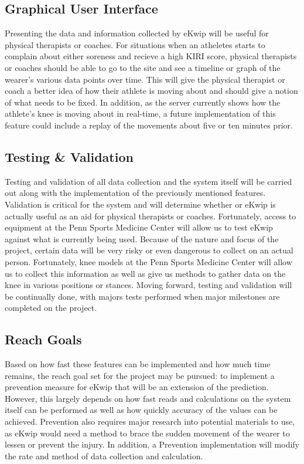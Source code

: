 \subsection {Graphical User Interface}
Presenting the data and information collected by eKwip will be useful for physical therapists or coaches. For situations when an atheletes starts to complain about either soreness and recieve a high KIRI score, physical therapists or coaches should be able to go to the site and see a timeline or graph of the wearer's various data points over time. This will give the physical therapist or coach a better idea of how their athlete is moving about and should give a notion of what needs to be fixed. In addition, as the server currently shows how the athlete's knee is moving about in real-time, a future implementation of this feature could include a replay of the movements about five or ten minutes prior.

\subsection {Testing \& Validation}
Testing and validation of all data collection and the system itself will be carried out along with the implementation of the previously mentioned features. Validation is critical for the system and will determine whether or eKwip is actually useful as an aid for physical therapists or coaches. Fortunately, access to equipment at the Penn Sports Medicine Center will allow us to test eKwip against what is currently being used. Because of the nature and focus of the project, certain data will be very risky or even dangerous to collect on an actual person. Fortunately, knee models at the Penn Sports Medicine Center will allow us to collect this information as well as give us methods to gather data on the knee in various positions or stances. Moving forward, testing and validation will be continually done, with majors tests performed when major milestones are completed on the project.

\subsection {Reach Goals}
Based on how fast these features can be implemented and how much time remains, the reach goal set for the project may be pursued: to implement a prevention measure for eKwip that will be an extension of the prediction. However, this largely depends on how fast reads and calculations on the system itself can be performed as well as how quickly accuracy of the values can be achieved. Prevention also requires major research into potential materials to use, as eKwip would need a method to brace the sudden movement of the wearer to lessen or prevent the injury. In addition, a Prevention implementation will modify the rate and method of data collection and calculation.
